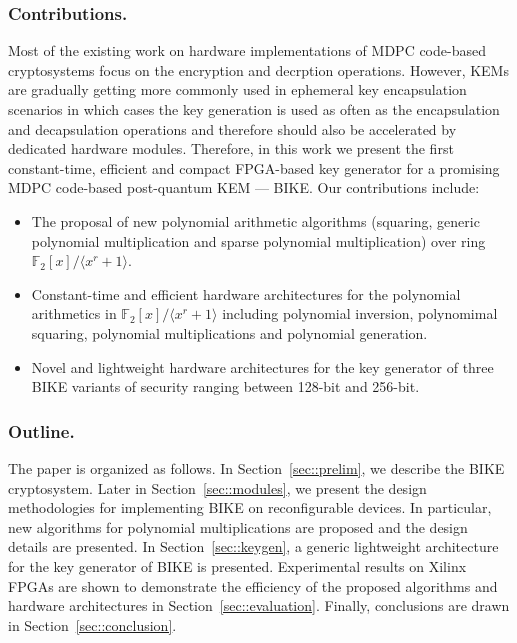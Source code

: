 \documentclass[runningheads]{llncs}
\begin{document}
\subsubsection{Contributions.} Most of the existing work on hardware implementations of MDPC code-based
cryptosystems focus on the encryption and decrption operations.
However, KEMs are gradually getting more commonly used in ephemeral
key encapsulation scenarios in which cases the key
generation is used as often as the encapsulation and decapsulation operations
and therefore should also be accelerated by dedicated hardware modules.
Therefore, in this work we present the first constant-time, efficient and compact
FPGA-based key generator for a promising MDPC code-based post-quantum KEM \mbox{---} BIKE.
Our contributions include:
\begin{itemize}
  \item The proposal of new polynomial arithmetic algorithms (squaring, generic polynomial multiplication and sparse polynomial multiplication) over ring $\mathbb{F}_2[x]/\langle x^r+1\rangle$.
  \item Constant-time and efficient hardware architectures for the polynomial arithmetics
  in $\mathbb{F}_2[x]/\langle x^r+1\rangle$ including polynomial inversion, polynomimal squaring, polynomial multiplications and
  polynomial generation.
  \item Novel and lightweight hardware architectures for the key generator of three BIKE variants of security ranging
  between 128-bit and 256-bit.
\end{itemize}

\subsubsection{Outline.}
The paper is organized as follows.
In Section~\ref{sec::prelim}, we describe the BIKE cryptosystem.
Later in Section~\ref{sec::modules}, we present the design methodologies
for implementing BIKE on reconfigurable devices.
In particular, new algorithms for
polynomial multiplications are proposed and
the design details are presented.
In Section~\ref{sec::keygen}, a generic lightweight architecture for the key generator of BIKE
is presented.
Experimental results on Xilinx FPGAs are shown to demonstrate the
efficiency of the proposed algorithms and hardware architectures
in Section~\ref{sec::evaluation}.
Finally, conclusions are drawn in Section~\ref{sec::conclusion}.
\end{document}
